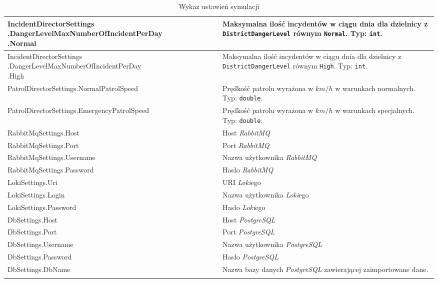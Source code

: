 \begin{longtable}{|p{0.5\linewidth} | p{0.5\linewidth}|}
     \hline
     \makecell[tl]{IncidentDirectorSettings\\.DangerLevelMaxNumberOfIncidentPerDay\\.Normal} & Maksymalna ilość incydentów w ciągu dnia dla dzielnicy z \texttt{DistrictDangerLevel} równym \texttt{Normal}. Typ: \texttt{int}. \\ 
     \hline
     \makecell[tl]{IncidentDirectorSettings\\.DangerLevelMaxNumberOfIncidentPerDay\\.High} & Maksymalna ilość incydentów w ciągu dnia dla dzielnicy z \texttt{DistrictDangerLevel} równym \texttt{High}. Typ: \texttt{int}. \\ 
     \hline
     PatrolDirectorSettings.NormalPatrolSpeed & Prędkość patrolu wyrażona w $km/h$ w warunkach normalnych. Typ: \texttt{double}. \\ 
     \hline
     PatrolDirectorSettings.EmergencyPatrolSpeed & Prędkość patrolu wyrażona w $km/h$ w warunkach specjalnych. Typ: \texttt{double}. \\ 
     \hline 
     RabbitMqSettings.Host & Host \emph{RabbitMQ} \\ 
     \hline 
     RabbitMqSettings.Port & Port \emph{RabbitMQ} \\ 
     \hline 
     RabbitMqSettings.Username & Nazwa użytkownika \emph{RabbitMQ} \\ 
     \hline 
     RabbitMqSettings.Password & Hasło \emph{RabbitMQ} \\ 
     \hline 
     LokiSettings.Uri & URI \emph{Loki}ego \\ 
     \hline 
     LokiSettings.Login & Nazwa użytkownika \emph{Loki}ego \\ 
     \hline
     LokiSettings.Password & Hasło \emph{Loki}ego \\ 
     \hline
     DbSettings.Host & Host \emph{PostgreSQL} \\ 
     \hline
     DbSettings.Port & Port \emph{PostgreSQL} \\ 
     \hline
     DbSettings.Username & Nazwa użytkownika \emph{PostgreSQL} \\ 
     \hline
     DbSettings.Password & Hasło \emph{PostgreSQL} \\ 
     \hline
     DbSettings.DbName & Nazwa bazy danych \emph{PostgreSQL} zawierającej zaimportowane dane. \\ 
     \hline
\caption{Wykaz ustawień symulacji}
\label{tab:configurationSimulationSettings}
\end{longtable}


